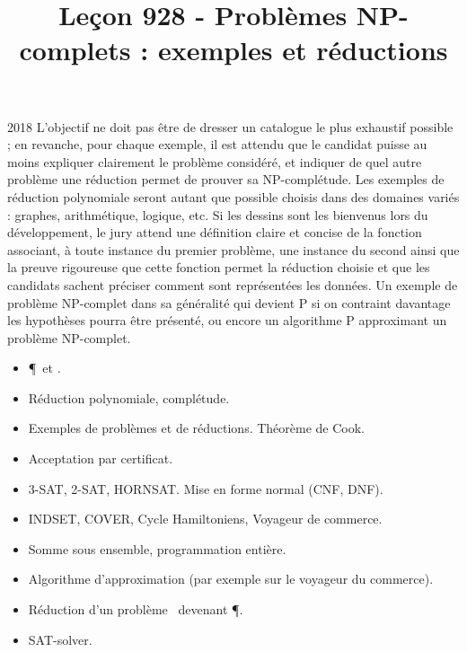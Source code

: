 \documentclass{agregfiche}
\title{Leçon 928 - Problèmes NP-complets : exemples et réductions}
\begin{document}
\maketitle

\secrapports
\begin{rapport}{2018}
    L’objectif ne doit pas être de dresser un catalogue le plus
    exhaustif possible ; en revanche, pour chaque
    exemple, il est attendu que le candidat puisse au moins expliquer
    clairement le problème considéré, et
    indiquer de quel autre problème une réduction permet de prouver
    sa NP-complétude.
    Les exemples de réduction polynomiale seront autant que possible
    choisis dans des domaines variés :
    graphes, arithmétique, logique, etc. Si les dessins sont les
    bienvenus lors du développement, le jury
    attend une définition claire et concise de la fonction associant,
    à toute instance du premier problème,
    une instance du second ainsi que la preuve rigoureuse que cette
    fonction permet la réduction choisie
    et que les candidats sachent préciser comment sont représentées
    les données.
    Un exemple de problème NP-complet dans sa généralité qui devient
    P si on contraint davantage les
    hypothèses pourra être présenté, ou encore un algorithme P
    approximant un problème NP-complet.
\end{rapport}

\secindispensables

\begin{itemize}
	\item \P\ et \NP.
    \item Réduction polynomiale, complétude.
    \item Exemples de problèmes et de réductions. Théorème de Cook.
\end{itemize}

\secasavoir

\begin{itemize}
    \item Acceptation par certificat.
    \item 3-SAT, 2-SAT, HORNSAT. Mise en forme normal (CNF, DNF).
    \item INDSET, COVER, Cycle Hamiltoniens, Voyageur de commerce.
    \item Somme sous ensemble, programmation entière.

\end{itemize}

\secidees

\begin{itemize}
	\item Algorithme d'approximation (par exemple sur le voyageur du
    commerce).
    \item Réduction d'un problème \NP\ devenant \P.
    \item SAT-solver.
\end{itemize}
\end{document}
